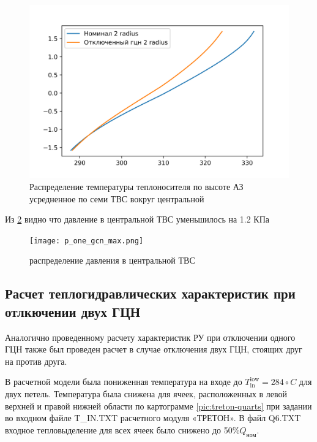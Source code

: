 \begin{figure}[H]
	\begin{center}
		\includegraphics{treton_one_gcn_2_radius_T.png}
		\caption{Распределение температуры теплоносителя по высоте АЗ усредненное по семи ТВС вокруг центральной}
		\label{pic:treton-one-gcn-2-radius-T}
	\end{center}
\end{figure}

Из \ref{pic:p-one-gcn-max} видно что давление в центральной ТВС уменьшилось на 1.2 КПа

\begin{figure}[H]
	\begin{center}
		\texttt{[image: p\_one\_gcn\_max.png]}
		\caption{распределение давления в центральной ТВС}
		\label{pic:p-one-gcn-max}
	\end{center}
\end{figure}

\subsection{Расчет теплогидравлических характеристик при отлкючении двух ГЦН}
Аналогично проведенному расчету характеристик РУ при отключении одного ГЦН также был проведен расчет в случае отключения двух ГЦН, стоящих друг на против друга.

В расчетной модели была пониженная температура на входе до  $T_{\text{in}}^{\text{low}}=284 \circ C$ для двух петель. Температура была снижена для ячеек, расположенных в левой верхней и правой нижней области по картограмме \ref{pic:treton-quarts} при задании во входном файле T\_IN.TXT расчетного модуля «ТРЕТОН». В файл Q6.TXT входное тепловыделение для всех ячеек было снижено до 50\%$Q_{\text{ном}}$. 

